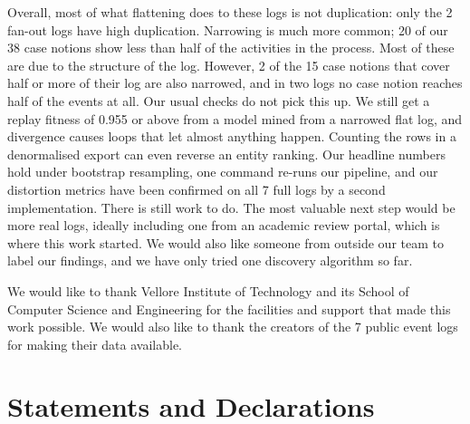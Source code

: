 \documentclass[pdflatex,sn-mathphys-num]{sn-jnl}
\begin{document}
Overall, most of what flattening does to these logs is not duplication: only the 2 fan-out logs have high duplication. Narrowing is much more common; 20 of our 38 case notions show less than half of the activities in the process. Most of these are due to the structure of the log. However, 2 of the 15 case notions that cover half or more of their log are also narrowed, and in two logs no case notion reaches half of the events at all. Our usual checks do not pick this up. We still get a replay fitness of 0.955 or above from a model mined from a narrowed flat log, and divergence causes loops that let almost anything happen. Counting the rows in a denormalised export can even reverse an entity ranking. Our headline numbers hold under bootstrap resampling, one command re-runs our pipeline, and our distortion metrics have been confirmed on all 7 full logs by a second implementation. There is still work to do. The most valuable next step would be more real logs, ideally including one from an academic review portal, which is where this work started. We would also like someone from outside our team to label our findings, and we have only tried one discovery algorithm so far.

\backmatter

We would like to thank Vellore Institute of Technology and its School of Computer Science and Engineering for the facilities and support that made this work possible. We would also like to thank the creators of the 7 public event logs for making their data available.

\section*{Statements and Declarations}
\end{document}
